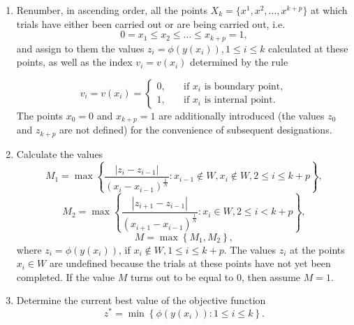 \documentclass[runningheads]{llncs}
\begin{document}
\begin{enumerate}
\item Renumber, in ascending order, all the points $X_k=\{x^1,x^2,...,x^{k+p} \}$ at which trials have either been carried out or are being carried out, i.e.
\[
0 = x_1 \leq x_2 \leq ... \leq x_{k+p} = 1,
\]
and assign to them the values $z_i = \phi(y(x_i)), 1 \leq i \leq k$ calculated at these points, as well as the index $v_i = v(x_i)$ determined by the rule

\begin{equation}\label{rule_points_index} 
v_i=v(x_i)=
\begin{cases}
    0,     & \quad \text{if } x_i \text{ is boundary point},\\
    1,     & \quad \text{if } x_i \text{ is internal point}.
\end{cases}
\end{equation}
The points $x_0=0$ and $x_{k+p}=1$ are additionally introduced (the values $z_0$ and $z_{k+p}$ are not defined) for the convenience of subsequent designations.

\item Calculate the values
\[
M_1= \max \left\{ \frac{|z_i - z_{i - 1}|}{(x_i - x_{i - 1})^\frac{1}{N}}: x_{i-1} \notin W, x_i \notin W, 2 \leq i \leq k+p \right\},
\]
\[
M_2= \max \left\{ \frac{|z_{i+1} - z_{i - 1}|}{(x_{i+1} - x_{i - 1})^\frac{1}{N}}: x_{i} \in W, 2 \leq i < k+p \right\},
\]
\[
M= \max \left\{ M_1, M_2 \right\},
\]
where $z_i=\phi(y(x_i))$, if $x_i \notin W, 1 \leq i \leq k+p$. The values $z_i$ at the points $x_i \in W$ are undefined because the trials at these points have not yet been completed. If the value $M$ turns out to be equal to $0$, then assume $M=1$.

\item Determine the current best value of the objective function
\begin{equation}\label{cur_best_val} 
z^* = \min \left\{ \phi(y(x_i)): 1 \leq i \leq k \right\}.
\end{equation}


\end{enumerate}
\end{document}
